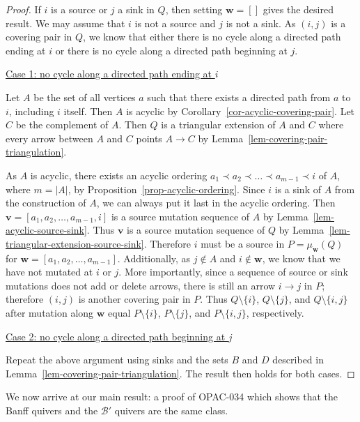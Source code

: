 \documentclass[ALCO,Unicode]{cedram}
\newcommand{\BB}{\mathcal{B}}
\newcommand{\bw}{{\boldsymbol{w}}}
\newcommand{\bv}{{\boldsymbol{v}}}
\begin{document}
\begin{proof}
    If $i$ is a source or $j$ a sink in $Q$, then setting $\bw = []$ gives the desired result.
    We may assume that $i$ is not a source and $j$ is not a sink.
    As $(i,j)$ is a covering pair in $Q$, we know that either there is no cycle along a directed path ending at $i$ or there is no cycle along a directed path beginning at $j$.

    \underline{Case 1: no cycle along a directed path ending at $i$}

    Let $A$ be the set of all vertices $a$ such that there exists a directed path from $a$ to $i$, including $i$ itself.
    Then $A$ is acyclic by Corollary~\ref{cor-acyclic-covering-pair}.
    Let $C$ be the complement of $A$.
    Then $Q$ is a triangular extension of $A$ and $C$ where every arrow between $A$ and $C$ points $A \to C$ by Lemma~\ref{lem-covering-pair-triangulation}.

    As $A$ is acyclic, there exists an acyclic ordering $a_1 \prec a_2 \prec \dots \prec a_{m-1} \prec i$ of $A$, where $m = |A|$, by Proposition~\ref{prop-acyclic-ordering}.
    Since $i$ is a sink of $A$ from the construction of $A$, we can always put it last in the acyclic ordering.
    Then $\bv = [a_1,a_{2},\dots,a_{m-1},i]$ is a source mutation sequence of $A$ by Lemma~\ref{lem-acyclic-source-sink}.
    Thus $\bv$ is a source mutation sequence of $Q$ by Lemma~\ref{lem-triangular-extension-source-sink}.
    Therefore $i$ must be a source in $P = \mu_{\bw}(Q)$ for $\bw = [a_1,a_2,\dots,a_{m-1}]$.
    Additionally, as $j \notin A$ and $i \notin \bw$, we know that we have not mutated at $i$ or $j$.
    More importantly, since a sequence of source or sink mutations does not add or delete arrows, there is still an arrow $i \to j$ in $P$; therefore $(i,j)$ is another covering pair in $P$.
    Thus $Q \setminus \{i\}$, $Q \setminus \{j\}$, and $Q \setminus \{i,j\}$ after mutation along $\bw$ equal $P \setminus \{i\}$, $P \setminus \{j\}$, and $P \setminus \{i,j\}$, respectively.
    
    \underline{Case 2: no cycle along a directed path beginning at $j$}

    Repeat the above argument using sinks and the sets $B$ and $D$ described in Lemma~\ref{lem-covering-pair-triangulation}.
    The result then holds for both cases.
\end{proof}

We now arrive at our main result: a proof of OPAC-034 which shows that the Banff quivers and the $\BB'$ quivers are the same class.
\end{document}
